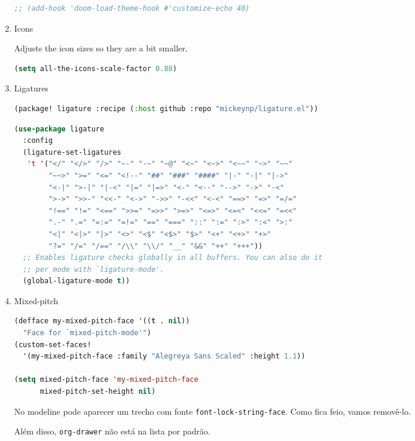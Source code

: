 \documentclass[11pt]{article}
\begin{document}
\begin{enumerate}
\begin{lstlisting}[language=Lisp]
;; (add-hook 'doom-load-theme-hook #'customize-echo 40)
\end{lstlisting}
  \item Icons
  \label{sec:icons}

  Adjusts the icon sizes so they are a bit smaller.

\begin{lstlisting}[language=Lisp]
(setq all-the-icons-scale-factor 0.88)
\end{lstlisting}
  \item Ligatures
  \label{sec:ligatures}

  \begin{lstlisting}[language=Lisp]
(package! ligature :recipe (:host github :repo "mickeynp/ligature.el"))
\end{lstlisting}

\begin{lstlisting}[language=Lisp]
(use-package ligature
  :config
  (ligature-set-ligatures
   't '("</" "</>" "/>" "~-" "-~" "~@" "<~" "<~>" "<~~" "~>" "~~"
        "~~>" ">=" "<=" "<!--" "##" "###" "####" "|-" "-|" "|->"
        "<-|" ">-|" "|-<" "|=" "|=>" "<-" "<--" "-->" "->" "-<"
        ">->" ">>-" "<<-" "<->" "->>" "-<<" "<-<" "==>" "=>" "=/="
        "!==" "!=" "<==" ">>=" "=>>" ">=>" "<=>" "<=<" "<<=" "=<<"
        ".-" ".=" "=:=" "=!=" "==" "===" "::" ":=" ":>" ":<" ">:"
        "<|" "<|>" "|>" "<>" "<$" "<$>" "$>" "<+" "<+>" "+>"
        "?=" "/=" "/==" "/\\" "\\/" "__" "&&" "++" "+++"))
  ;; Enables ligature checks globally in all buffers. You can also do it
  ;; per mode with `ligature-mode'.
  (global-ligature-mode t))
\end{lstlisting}
  \item Mixed-pitch
  \label{sec:mixed-pitch}

  \begin{lstlisting}[language=Lisp]
(defface my-mixed-pitch-face '((t . nil))
  "Face for `mixed-pitch-mode'")
(custom-set-faces!
  '(my-mixed-pitch-face :family "Alegreya Sans Scaled" :height 1.1))

(setq mixed-pitch-face 'my-mixed-pitch-face
      mixed-pitch-set-height nil)
\end{lstlisting}

No modeline pode aparecer um trecho com fonte \lstinline|font-lock-string-face|. Como fica feio, vamos removê-lo.

Além disso, \lstinline|org-drawer| não está na lista por padrão.


\end{enumerate}
\end{document}
